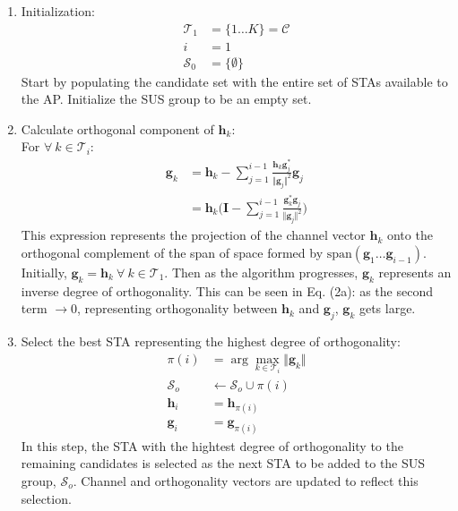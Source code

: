 \begin{enumerate}
    \item Initialization:
    \begin{subequations}
        \begin{align}
            \mathcal{T}_1 &= \lbrace 1 \ldots K \rbrace = \mathcal{C}\\
            i &= 1\\
            \mathcal{S}_0 &= \lbrace \emptyset \rbrace
        \end{align}
    \end{subequations}
    Start by populating the candidate set with the entire set of STAs available to the AP. Initialize the SUS group to be an empty set.
    \item Calculate orthogonal component of $\textbf{h}_k$:\\
    For $\forall \ k \in \mathcal{T}_i$:
    \begin{subequations}
        \begin{align}
            \textbf{g}_k &= \textbf{h}_k - \sum_{j=1}^{i-1}\frac{\textbf{h}_k\textbf{g}_j^*}{\Vert \textbf{g}_j \Vert^2}\textbf{g}_j \\
            &= \textbf{h}_k\bigg(\textbf{I}-\sum_{j=1}^{i-1}\frac{\textbf{g}_k^*\textbf{g}_j}{\Vert \textbf{g}_j \Vert^2}\bigg)
        \end{align}
    \end{subequations}
    This expression represents the projection of the channel vector $\textbf{h}_k$ onto the orthogonal complement of the span of space formed by $\text{span}(\textbf{g}_1\ldots \textbf{g}_{i-1})$. Initially, $\textbf{g}_k = \textbf{h}_k \ \forall \ k \in \mathcal{T}_1$. Then as the algorithm progresses, $\textbf{g}_k$ represents an inverse degree of orthogonality. This can be seen in Eq. (2a): as the second term $\longrightarrow 0$, representing orthogonality between $\textbf{h}_k$ and $\textbf{g}_j$, $\textbf{g}_k$ gets large.
    
    \item Select the best STA representing the highest degree of orthogonality:
    \begin{subequations}
        \begin{align}
            \pi(i) &= \arg\max_{k\in \mathcal{T}_i}\Vert \textbf{g}_k \Vert\\
            \mathcal{S}_o &\longleftarrow \mathcal{S}_o \cup \pi(i)\\
            \textbf{h}_i &= \textbf{h}_{\pi(i)}\\
            \textbf{g}_i &= \textbf{g}_{\pi(i)}
        \end{align}
    \end{subequations}
    In this step, the STA with the hightest degree of orthogonality to the remaining candidates is selected as the next STA to be added to the SUS group, $\mathcal{S}_o$. Channel and orthogonality vectors are updated to reflect this selection.
    

\end{enumerate}
